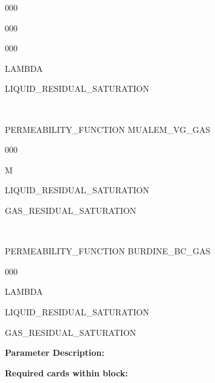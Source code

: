 \begin{deflist}{000}
\begin{deflist}{000}
\begin{deflist}{000}
\item LAMBDA
\item LIQUID\_RESIDUAL\_SATURATION
\end{deflist}
\item [\keyend] ~

\item [PERMEABILITY\_FUNCTION] MUALEM\_VG\_GAS
\begin{deflist}{000}
\item M
\item LIQUID\_RESIDUAL\_SATURATION
\item GAS\_RESIDUAL\_SATURATION
\end{deflist}
\item [\keyend] ~

\item [PERMEABILITY\_FUNCTION] BURDINE\_BC\_GAS
\begin{deflist}{000}
\item LAMBDA
\item LIQUID\_RESIDUAL\_SATURATION
\item GAS\_RESIDUAL\_SATURATION
\end{deflist}
\item [\keyend]
\end{deflist}
\item [\keyend]
\end{deflist}

{\noindent\bf Parameter Description:}

{\noindent\bf Required cards within block:}

